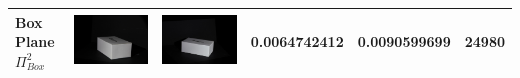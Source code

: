 \documentclass[final,12pt,3p]{elsarticle}
\begin{document}
\begin{table}[!ht]
{\begin{tabular}{| l | >{\centering\arraybackslash} m{2.5cm} | >{\centering\arraybackslash} m{2.5cm} | c | c | c |}
   Box Plane $\Pi_{Box}^{2}$ & \includegraphics[scale=0.05]{./box_cam1.JPG} & \includegraphics[scale=0.05]{./box_cam2.JPG} & 0.0064742412	& 0.0090599699 & 24980\\
   \hline

\end{tabular}}
\end{table}
\end{document}
